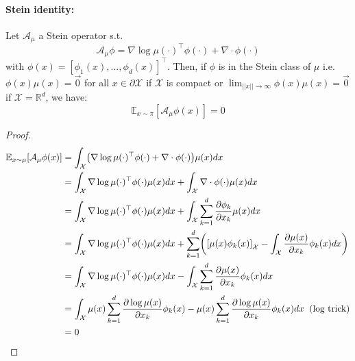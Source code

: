 \documentclass[runningheads,a4paper]{llncs}
\newcommand{\R}{\mathbb{R}}
\newcommand{\E}{\mathbb{E}}
\newcommand{\X}{\mathcal{X}}
\newcommand{\A}{\mathcal{A}}
\newcommand{\diff}[2]{\frac{\partial #1}{\partial #2}}
\DeclarePairedDelimiter{\pare}{(}{)}
\DeclarePairedDelimiter{\sq}{[}{]}
\begin{document}
\paragraph{\bf Stein identity:}
Let $\A_\mu$ a Stein operator s.t.
$$
\A_\mu \phi = \nabla \log \mu(\cdot)^\top \phi(\cdot) + \nabla \cdot \phi(\cdot)
$$
with $\phi(x) = [\phi_1(x), ..., \phi_d(x)]^\top$.
Then, if $\phi$ is in the Stein class of $\mu$ i.e. $\phi(x)\mu(x) = \vec{0}$ for all $x \in \partial \X$
if $\X$ is compact or $\lim_{||x|| \to \infty} \phi(x) \mu(x) = \vec{0}$ if $\X = \R^d$, we have:
\begin{equation}
  \E_{x \sim \pi}[\A_\mu \phi (x)] = 0
  \label{eq:stein_id}
\end{equation}
\begin{proof}
  \begin{align*}
    \E_{x \sim \mu}[\A_\mu \phi (x)] &=
      \int_\X \pare*{ \nabla \log \mu(\cdot)^\top \phi(\cdot) + \nabla \cdot \phi(\cdot) } \mu(x) dx \\
    &= \int_\X \nabla \log \mu(\cdot)^\top \phi(\cdot) \mu(x) dx + \int_\X \nabla \cdot \phi(\cdot) \mu(x) dx \\
    &= \int_\X \nabla \log \mu(\cdot)^\top \phi(\cdot) \mu(x) dx +
      \int_\X \sum_{k=1}^d \diff{\phi_k}{x_k} \mu(x) dx \\
    &= \int_\X \nabla \log \mu(\cdot)^\top \phi(\cdot) \mu(x) dx +
    \sum_{k=1}^d \pare*{ \sq*{\mu(x) \phi_k(x)}_\X - \int_\X \diff{\mu(x)}{x_k} \phi_k(x) dx} \\
    &= \int_\X \nabla \log \mu(\cdot)^\top \phi(\cdot) \mu(x) dx -
      \int_\X \sum_{k=1}^d \diff{\mu(x)}{x_k} \phi_k(x) dx \\
    &= \int_\X  \mu(x) \sum_{k=1}^d \diff{\log \mu(x)}{x_k}\phi_k(x) -
    \mu(x) \sum_{k=1}^d \diff{\log \mu(x)}{x_k} \phi_k(x) dx \;\; \text{(log trick)} \\
    &= 0
  \end{align*}
\end{proof}
\end{document}
